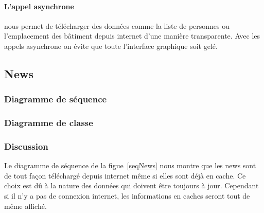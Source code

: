 		\paragraph{L'appel asynchrone} nous permet de télécharger des données comme la liste de personnes ou l'emplacement des bâtiment depuis internet d'une manière transparente. Avec les appels asynchrone on évite que toute l'interface graphique soit gelé.

		
	\subsection{News}
			\subsubsection*{Diagramme de séquence}
			\subsubsection*{Diagramme de classe}
			\subsubsection*{Discussion}
			Le diagramme de séquence de la figue~\ref{seqNews} nous montre que les news sont de tout façon téléchargé depuis internet même si elles sont déjà en cache. Ce choix est dû à la nature des données qui doivent être toujours à jour. Cependant si il n'y a pas de connexion internet, les informations en caches seront tout de même affiché. 
			
